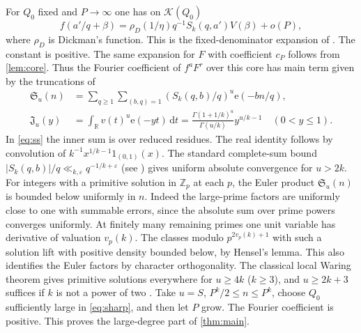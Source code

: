 \documentclass[11pt,letterpaper]{article}
\theoremstyle{definition}
\newcommand{\Z}{\mathbb Z}
\newcommand{\R}{\mathbb R}
\newcommand{\e}{\mathrm e}
\newcommand{\dd}{\,\mathrm d}
\newcommand{\eps}{\varepsilon}
\newcommand{\Si}{\mathfrak S}
\newcommand{\Ji}{\mathfrak J}
\begin{document}
For $Q_0$ fixed and $P\to\infty$ one has on $\mathcal K(Q_0)$
\[
 f(a'/q+\beta)=\rho_D(1/\eta)q^{-1}S_k(q,a')V(\beta)+o(P),
\]
where $\rho_D$ is Dickman's function. This is the fixed-denominator
expansion of \cite[\S6, preceding (6.15)]{BW23}. The constant is
positive. The same expansion for $F$ with coefficient $c_P$ follows from
\cref{lem:core}. Thus the Fourier coefficient of $f^a F^r$ over this
core has main term given by the truncations of
\begin{align}
 \Si_u(n)&=\sum_{q\ge1}\sum_{(b,q)=1}
       (S_k(q,b)/q)^u\e(-bn/q),\label{eq:ss}\\
 \Ji_u(y)&=\int_\R v(t)^u\e(-yt)\dd t
       =\frac{\Gamma(1+1/k)^u}{\Gamma(u/k)}y^{u/k-1}
        \quad (0<y\le1).\label{eq:si}
\end{align}
In \eqref{eq:ss} the inner sum is over reduced residues. The real
identity follows by convolution of $k^{-1}x^{1/k-1}1_{(0,1)}(x)$.
The standard complete-sum bound
$|S_k(q,b)|/q\ll_{k,\eps}q^{-1/k+\eps}$ (see \cite[Ch.~4]{Vbook})
gives uniform absolute convergence for $u>2k$. For integers with a
primitive solution in $\Z_p$ at each $p$, the Euler product
$\Si_u(n)$ is bounded below uniformly in $n$. Indeed the large-prime
factors are uniformly close to one with summable errors, since the
absolute sum over prime powers converges uniformly. At finitely many
remaining primes one unit variable has derivative of valuation $v_p(k)$.
The classes modulo $p^{2v_p(k)+1}$ with such a solution lift with
positive density bounded below, by Hensel's lemma. This also identifies
the Euler factors by character orthogonality. The classical local
Waring theorem gives primitive solutions everywhere for $u\ge4k$
($k\ge3$), and $u\ge2k+3$ suffices if $k$ is not a power of two
\cite[\S2]{VWsurvey}. Take $u=S$, $P^k/2\le n\le P^k$, choose
$Q_0$ sufficiently large in \eqref{eq:sharp}, and then let $P$ grow.
The Fourier coefficient is positive. This proves the large-degree
part of \cref{thm:main}.
\end{document}

